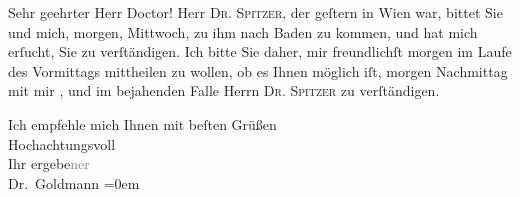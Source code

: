 \pstart\center{}Sehr geehrter Herr Doctor!\pend\vspace{0.5em}
\pstart
           Herr \textsc{Dr. Spitzer}, der geſtern in Wien war, bittet Sie und mich, morgen,
                  Mittwoch, zu ihm nach Baden zu kommen,
               und hat mich erſucht, Sie zu verſtändigen. Ich bitte Sie daher, mir freundlichſt
                  morgen im Laufe des Vormittags
               mittheilen zu {\pb}wollen, ob es Ihnen möglich iſt,
                  morgen{ }Nachmittag mit mir \label{K_L02641-1v}\label{K_L02641-1}, und im bejahenden Falle Herrn \textsc{Dr. Spitzer} zu verſtändigen.\pend
           
\pstart
           Ich empfehle mich Ihnen mit beſten Grüßen {\\[\baselineskip]}Hochachtungsvoll {\\[\baselineskip]}Ihr
                  ergebe\textcolor{gray}{ner}{\\[\baselineskip]}\spacefill\mbox{Dr. Goldmann}\pend
           \leftskip=0em{}\endnumbering{}  
      
